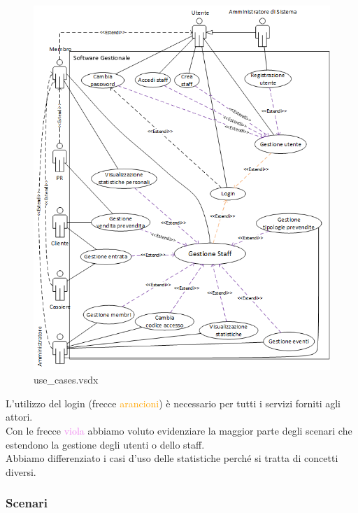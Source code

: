 \documentclass[a4paper]{article}
\begin{document}


\begin{figure}[H]
    \includegraphics[scale=1]{Analisi/Cases/use_cases.png}
    \centering
    \caption{use\_cases.vsdx}
\end{figure}

L'utilizzo del login (frecce \textcolor{orange}{arancioni}) è necessario per tutti i servizi forniti agli attori.\\Con le frecce \textcolor{violet}{viola} abbiamo voluto evidenziare la maggior parte degli scenari che estendono la gestione degli utenti o dello staff.\\Abbiamo differenziato i casi d'uso delle statistiche perché si tratta di concetti diversi.    

\newpage

\subsubsection{Scenari}
\end{document}
